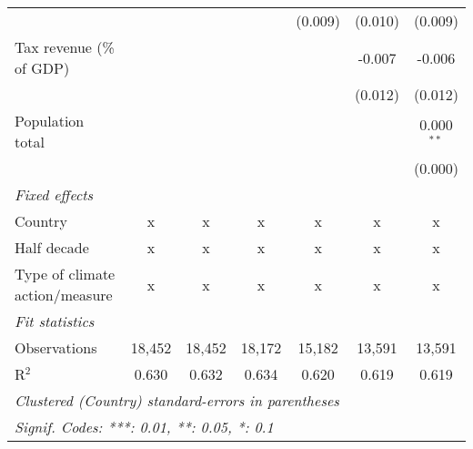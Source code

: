 \begin{tabular}{lcccccc}
                                                     &                &               &               & (0.009)        & (0.010)        & (0.009)\\   
   Tax revenue (\% of GDP)                           &                &               &               &                & -0.007         & -0.006\\   
                                                     &                &               &               &                & (0.012)        & (0.012)\\   
   Population total                                  &                &               &               &                &                & 0.000$^{**}$\\   
                                                     &                &               &               &                &                & (0.000)\\   
   \emph{Fixed effects}\\
   Country                                           & x              & x             & x             & x              & x              & x\\  
   Half decade                                       & x              & x             & x             & x              & x              & x\\  
   Type of climate action/measure                    & x              & x             & x             & x              & x              & x\\  
   \midrule \emph{Fit statistics}\\
   Observations                                      & 18,452         & 18,452        & 18,172        & 15,182         & 13,591         & 13,591\\  
   R$^2$                                             & 0.630          & 0.632         & 0.634         & 0.620          & 0.619          & 0.619\\  
   \midrule
   \multicolumn{7}{l}{\emph{Clustered (Country) standard-errors in parentheses}}\\
   \multicolumn{7}{l}{\emph{Signif. Codes: ***: 0.01, **: 0.05, *: 0.1}}\\
\end{tabular}
\par\endgroup


